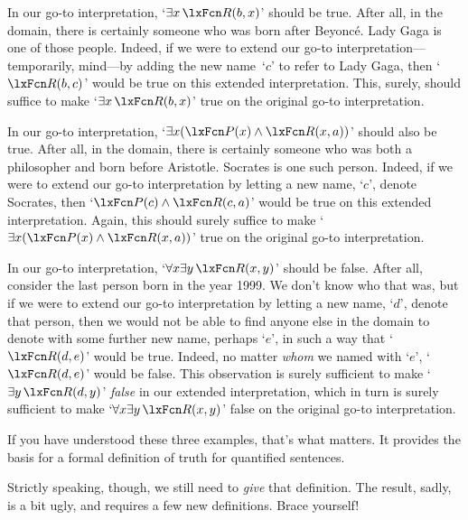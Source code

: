 In our go-to interpretation, `$\exists x\, \atom{R}{b,x}$' should be
true. After all, in the domain, there is certainly someone who was
born after Beyonc\'e. Lady Gaga is one of those people. Indeed, if we
were to extend our go-to interpretation---temporarily, mind---by
adding the new name~`$c$' to refer to Lady Gaga, then
`$\atom{R}{b,c}$' would be true on this extended interpretation. This,
surely, should suffice to make `$\exists x\, \atom{R}{b,x}$' true on
the original go-to interpretation.

In our go-to interpretation, `$\exists x (\atom{P}{x} \eand \atom{R}{x,a})$' should also be true. After all, in the domain, there is certainly someone who was both a philosopher and born before Aristotle. Socrates is one such person. Indeed, if we were to extend our go-to interpretation by letting a new name, `$c$', denote Socrates, then `$\atom{P}{c} \eand \atom{R}{c,a}$' would be true on this extended interpretation. Again, this should surely suffice to make `$\exists x (\atom{P}{x} \eand \atom{R}{x,a})$' true on the original go-to interpretation.

In our go-to interpretation, `$\forall x \exists y\, \atom{R}{x,y}$' should be false. After all, consider the last person born in the year 1999. We don't know who that was, but if we were to extend our go-to interpretation by letting a new name, `$d$', denote that person, then we would not be able to find anyone else in the domain to denote with some further new name, perhaps `$e$', in such a way that `$\atom{R}{d,e}$' would be true. Indeed, no matter \emph{whom} we named with `$e$', `$\atom{R}{d,e}$' would be false. This observation is surely sufficient to make `$\exists y\, \atom{R}{d,y}$' \emph{false} in our extended interpretation, which in turn is surely sufficient to make `$\forall x \exists y\, \atom{R}{x,y}$' false on the original go-to interpretation.

If you have understood these three examples, that's what matters. It provides the basis for a formal definition of truth for quantified sentences.

Strictly speaking, though, we still need to \emph{give} that definition. The result, sadly, is a bit ugly, and requires a few new definitions. Brace yourself!

